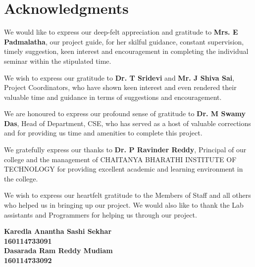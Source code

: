 \cleardoublepage
{}
{}
\chapter*{Acknowledgments}
We would like to express our deep-felt appreciation and gratitude to \textbf{Mrs. E Padmalatha}, our project guide, for her skilful guidance, constant supervision, timely suggestion, keen interest and encouragement in completing the individual seminar within the stipulated time.
\par
We wish to express our gratitude to \textbf{Dr. T Sridevi} and \textbf{Mr. J Shiva Sai}, Project Coordinators, who have shown keen interest and even rendered their valuable time and guidance in terms of suggestions and encouragement.
\par
We are honoured to express our profound sense of gratitude to \textbf{Dr. M Swamy Das}, Head of Department, CSE, who has served as a host of valuable corrections and for providing us time and amenities to complete this project.
\par
We gratefully express our thanks to \textbf{Dr. P Ravinder Reddy}, Principal of our college and the management of CHAITANYA BHARATHI INSTITUTE OF TECHNOLOGY for providing excellent academic and learning environment in the college.
\par
We wish to express our heartfelt gratitude to the Members of Staff and all others who helped us in bringing up our project. We would also like to thank the Lab assistants and Programmers for helping us through our project.
\\
\begin{flushright}
\textbf{Karedla Anantha Sashi Sekhar}\\\textbf{160114733091}\\\textbf{Dasarada Ram Reddy Mudiam}\\\textbf{160114733092}
\end{flushright}
\newpage
